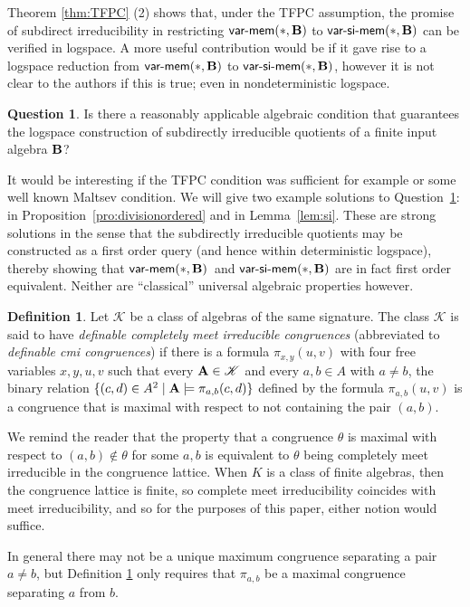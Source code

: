 \documentclass[10pt,a4paper]{amsart}
\theoremstyle{plain}
\theoremstyle{definition}
\newtheorem{defn}[thm]{Definition}
\newtheorem{question}[thm]{Question}
\newcommand{\varmem}{\textsf{var-mem}}
\newcommand{\varsimem}{\textsf{var-si-mem}}
\newcommand{\up}[1]{\textup{#1}}
\begin{document}
Theorem \ref{thm:TFPC} (2) shows that, under the TFPC assumption,  the promise of subdirect irreducibility in restricting $\varmem(*,{\bf B})$ to $\varsimem(*,{\bf B})$ can be verified in logspace.  
A more useful contribution would be if it gave rise to a logspace reduction from $\varmem(*,{\bf B})$ to $\varsimem(*,{\bf B})$, however it is not clear to the authors if this is true; even in nondeterministic logspace.  
\begin{question}\label{question:logspacesi}
Is there a reasonably applicable algebraic condition that guarantees the logspace construction of subdirectly irreducible quotients of a finite input algebra ${\bf B}$? 
\end{question}
It would be interesting if the TFPC condition was sufficient for example or some well known Maltsev condition.  
We will give two example solutions to Question~\ref{question:logspacesi}: in Proposition~\ref{pro:divisionordered} and in Lemma~\ref{lem:si}.  
These are strong solutions in the sense that the subdirectly irreducible quotients may be constructed as a first order query (and hence within deterministic logspace), thereby showing that $\varmem(*,{\bf B})$\ and $\varsimem(*,{\bf B})$ are in fact first order equivalent.  
Neither are ``classical'' universal algebraic properties however.
\begin{defn}\label{defn:cmi}
Let $\mathscr{K}$ be a class of  algebras of the same signature.  The class $\mathscr{K}$ is said to have \emph{definable completely meet irreducible congruences} \up(abbreviated to \emph{definable cmi congruences}\up) if there is a formula $\pi_{x,y}(u,v)$ with four free variables $x,y,u,v$ such that every ${\bf A}\in \mathscr{K}$ and every $a,b\in A$ with $a\neq b$, the binary relation $\{(c,d)\in A^2\mid {\bf A}\models \pi_{a,b}(c,d)\}$ defined by the formula $\pi_{a,b}(u,v)$ is a congruence that is maximal with respect to not containing the pair $(a,b)$.
\end{defn}
We remind the reader that the property that a congruence $\theta$ is maximal with respect to $(a,b)\notin\theta$ for some $a,b$ is equivalent to $\theta$ being completely meet irreducible in the congruence lattice.  When $K$ is a class of finite algebras, then the congruence lattice is finite, so complete meet irreducibility coincides with meet irreducibility, and so for the purposes of this paper, either notion would suffice.

In general there may not be a unique maximum congruence separating a pair $a\neq b$, but Definition \ref{defn:cmi} only requires that $\pi_{a,b}$ be a maximal congruence separating $a$ from $b$.  
\end{document}
